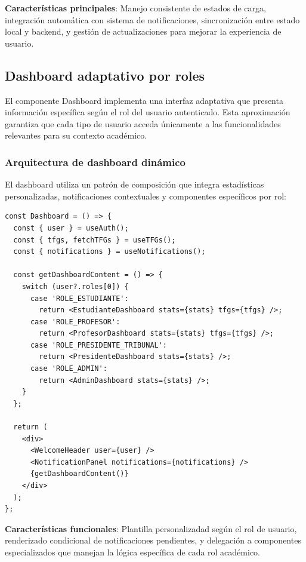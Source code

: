 \documentclass[12pt,a4paper,oneside]{report}
\begin{document}
\textbf{Características principales}: Manejo consistente de estados de carga, integración automática con sistema de notificaciones, sincronización entre estado local y backend, y gestión de actualizaciones para mejorar la experiencia de usuario.

\subsection{Dashboard adaptativo por roles}\label{componentes-de-interfaz-principales}

El componente Dashboard implementa una interfaz adaptativa que presenta información específica según el rol del usuario autenticado. Esta aproximación garantiza que cada tipo de usuario acceda únicamente a las funcionalidades relevantes para su contexto académico.

\subsubsection{Arquitectura de dashboard dinámico}\label{componente-dashboard}

El dashboard utiliza un patrón de composición que integra estadísticas personalizadas, notificaciones contextuales y componentes específicos por rol:

\begin{lstlisting}
const Dashboard = () => {
  const { user } = useAuth();
  const { tfgs, fetchTFGs } = useTFGs();
  const { notifications } = useNotifications();

  const getDashboardContent = () => {
    switch (user?.roles[0]) {
      case 'ROLE_ESTUDIANTE':
        return <EstudianteDashboard stats={stats} tfgs={tfgs} />;
      case 'ROLE_PROFESOR':
        return <ProfesorDashboard stats={stats} tfgs={tfgs} />;
      case 'ROLE_PRESIDENTE_TRIBUNAL':
        return <PresidenteDashboard stats={stats} />;
      case 'ROLE_ADMIN':
        return <AdminDashboard stats={stats} />;
    }
  };

  return (
    <div>
      <WelcomeHeader user={user} />
      <NotificationPanel notifications={notifications} />
      {getDashboardContent()}
    </div>
  );
};
\end{lstlisting}

\textbf{Características funcionales}: Plantilla personalizadad según el rol de usuario, renderizado condicional de notificaciones pendientes, y delegación a componentes especializados que manejan la lógica específica de cada rol académico.
\end{document}
